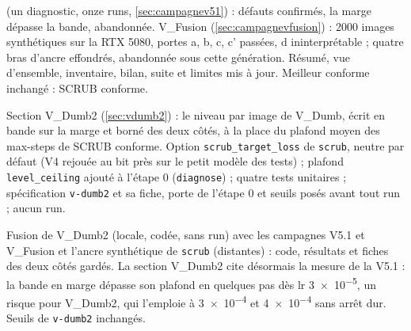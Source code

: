 \documentclass[11pt,a4paper]{article}
\newcommand{\code}[1]{\texttt{#1}}
\begin{document}
\begin{description}[leftmargin=1.2em,font=\sffamily\bfseries\color{bleu}]
    (un diagnostic, onze runs, \cref{sec:campagnev51}) : défauts confirmés, la marge dépasse la bande,
    abandonnée. V\_Fusion (\cref{sec:campagnevfusion}) : 2000 images synthétiques sur la RTX 5080, portes
    a, b, c, c' passées, d ininterprétable ; quatre bras d'ancre effondrés, abandonnée sous cette
    génération. Résumé, vue d'ensemble, inventaire, bilan, suite et limites mis à jour. Meilleur
    conforme inchangé : SCRUB conforme.
  \item[22 novembre 2026, V\_Dumb2] Section V\_Dumb2 (\cref{sec:vdumb2}) : le niveau par image de
    V\_Dumb, écrit en bande sur la marge et borné des deux côtés, à la place du plafond moyen des
    max-steps de SCRUB conforme. Option \code{scrub\_target\_loss} de \code{scrub}, neutre par défaut
    (V4 rejouée au bit près sur le petit modèle des tests) ; plafond \code{level\_ceiling} ajouté à
    l'étape 0 (\code{diagnose}) ; quatre tests unitaires ; spécification \code{v-dumb2} et sa fiche,
    porte de l'étape 0 et seuils posés avant tout run ; aucun run.
  \item[22 novembre 2026, septième fusion] Fusion de V\_Dumb2 (locale, codée, sans run) avec les
    campagnes V5.1 et V\_Fusion et l'ancre synthétique de \code{scrub} (distantes) : code, résultats
    et fiches des deux côtés gardés. La section V\_Dumb2 cite désormais la mesure de la V5.1 : la
    bande en marge dépasse son plafond en quelques pas dès lr \num{3e-5}, un risque pour V\_Dumb2,
    qui l'emploie à \num{3e-4} et \num{4e-4} sans arrêt dur. Seuils de \code{v-dumb2} inchangés.
\end{description}

\printbibliography[heading=bibintoc,title={Références}]
\end{document}
